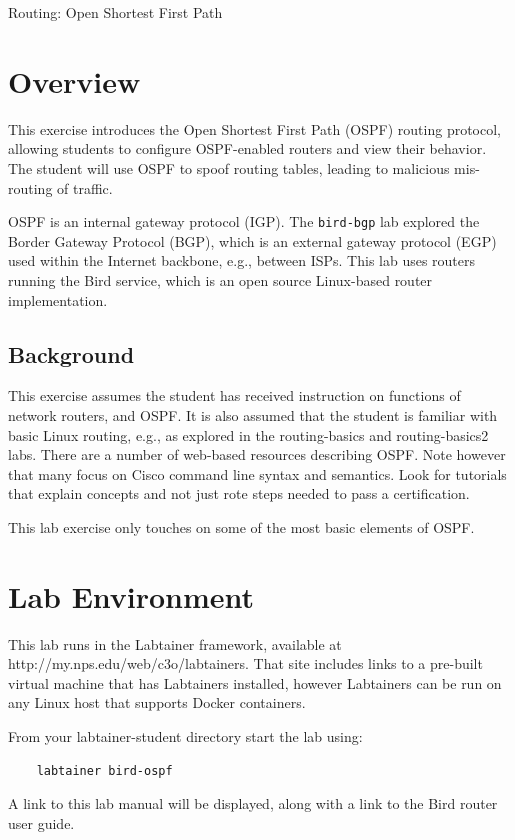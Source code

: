 


\begin{center}
{\LARGE Routing: Open Shortest First Path}
\vspace{0.1in}\\
\end{center}


\section{Overview}
This exercise introduces the Open Shortest First Path (OSPF) routing protocol,
allowing students to configure OSPF-enabled routers and view their behavior.
The student will use OSPF to spoof routing tables, leading to malicious mis-routing
of traffic.

OSPF is an internal gateway protocol (IGP).   The {\tt bird-bgp} lab explored the
Border Gateway Protocol (BGP), which is an external gateway protocol (EGP) used within the
Internet backbone, e.g., between ISPs.
This lab uses routers running the Bird service, which is an open source Linux-based router
implementation.

\subsection{Background}
This exercise assumes the student has received instruction on functions
of network routers, and OSPF.  
It is also assumed that the student is familiar with basic Linux routing, e.g., as explored in the
routing-basics and routing-basics2 labs.
There are a number of web-based resources describing OSPF.  Note however that many focus on Cisco
command line syntax and semantics.  Look for tutorials that explain concepts and not just rote 
steps needed to pass a certification.

This lab exercise only touches on some of the most basic elements of OSPF.

\section{Lab Environment}
This lab runs in the Labtainer framework,
available at http://my.nps.edu/web/c3o/labtainers.
That site includes links to a pre-built virtual machine
that has Labtainers installed, however Labtainers can
be run on any Linux host that supports Docker containers.

From your labtainer-student directory start the lab using:
\begin{verbatim}
    labtainer bird-ospf
\end{verbatim}
A link to this lab manual will be displayed, along with a link to the Bird router 
user guide.

